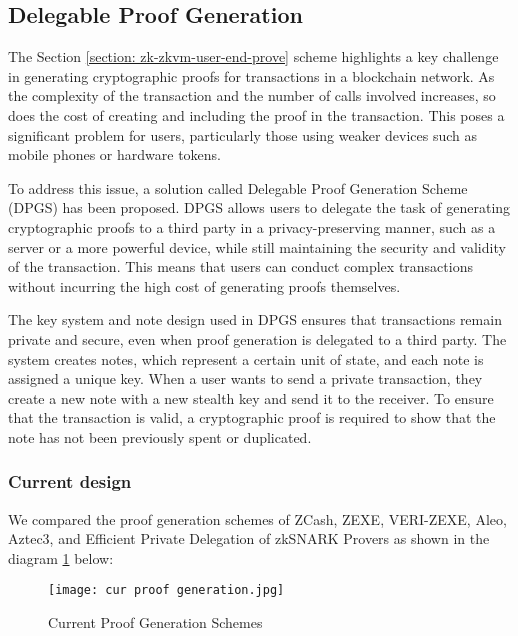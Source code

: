 \subsection{Delegable Proof Generation}\label{section: zk-zkvm-delegable-prove}

The Section \ref{section: zk-zkvm-user-end-prove} scheme highlights a key challenge in generating cryptographic proofs for transactions in a blockchain network. As the complexity of the transaction and the number of calls involved increases, so does the cost of creating and including the proof in the transaction. This poses a significant problem for users, particularly those using weaker devices such as mobile phones or hardware tokens.

To address this issue, a solution called Delegable Proof Generation Scheme (DPGS) has been proposed. DPGS allows users to delegate the task of generating cryptographic proofs to a third party in a privacy-preserving manner, such as a server or a more powerful device, while still maintaining the security and validity of the transaction. This means that users can conduct complex transactions without incurring the high cost of generating proofs themselves.

The key system and note design used in DPGS ensures that transactions remain private and secure, even when proof generation is delegated to a third party. The system creates notes, which represent a certain unit of state, and each note is assigned a unique key. When a user wants to send a private transaction, they create a new note with a new stealth key and send it to the receiver. To ensure that the transaction is valid, a cryptographic proof is required to show that the note has not been previously spent or duplicated.

\subsubsection{Current design}

We compared the proof generation schemes of ZCash\cite{website:zcash-nu5}, ZEXE\cite{cryptoeprint:2018/962}, VERI-ZEXE\cite{cryptoeprint:2022/802}, Aleo\cite{website:aleo-vm}, Aztec3\cite{website:Aztec3}, and Efficient Private Delegation of zkSNARK Provers\cite{website:epdzp} as shown in the diagram \ref{fig:cur_proof_generation} below:
\begin{figure}[!ht]
    \centering
    \texttt{[image: cur proof generation.jpg]}
    \caption{Current Proof Generation Schemes}
    \label{fig:cur_proof_generation}
\end{figure}

